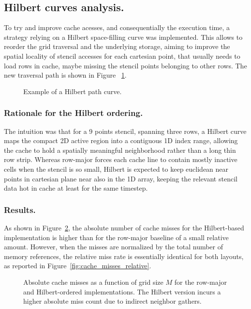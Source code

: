 \subsection{Hilbert curves analysis.}
To try and improve cache acesses, and consequentially the execution time,
a strategy relying on a Hilbert space-filling curve was implemented.
This allows to reorder the
grid traversal and the underlying storage, aiming to improve the
spatial locality
of stencil accesses for each cartesian point, that usually needs
to load rows in cache, maybe missing the stencil points belonging to other rows.
The new traversal path is shown in Figure ~\ref{fig:hilbert_path}.
\begin{figure}[h]
  \centering
  
  \caption{Example of a Hilbert path curve.}
  \label{fig:hilbert_path}
\end{figure}

\subsubsection{Rationale for the Hilbert ordering.}
The intuition was that for a 9 points stencil, spanning three rows, a
Hilbert curve maps the
compact 2D active region into a contiguous 1D index range, allowing the cache to
hold a spatially meaningful neighborhood rather than a long thin row strip.
Whereas row-major forces each cache line to contain mostly inactive cells when
the stencil is so small, Hilbert is expected to keep euclidean near points
in cartesian plane near also in the 1D array, keeping
the relevant stencil data hot in cache at least for the same timestep.

\subsubsection{Results.}

As shown in
Figure~\ref{fig:cache_misses_absolute},
the absolute number of cache misses for the Hilbert-based
implementation is higher
than for the row-major baseline of a small relative amount.
However, when the misses are normalized
by the total
number of memory references, the relative miss rate is essentially identical for
both layouts, as reported in Figure~\ref{fig:cache_misses_relative}.
\begin{figure}[h]
  \centering
  

  \caption{Absolute cache misses as a function of grid size $M$ for the
    row-major and Hilbert-ordered implementations. The Hilbert version incurs a
  higher absolute miss count due to indirect neighbor gathers.}
  \label{fig:cache_misses_absolute}
\end{figure}

